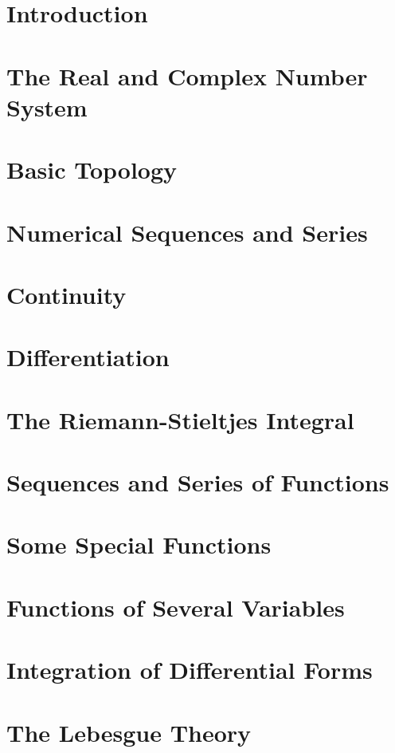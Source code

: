 
\chapter{Introduction}\label{chap:intro}


\chapter{The Real and Complex Number System}\label{chap:number-systems}


\chapter{Basic Topology}\label{chap:topology}
% 

\chapter{Numerical Sequences and Series}\label{chap:seq-series}
% 

\chapter{Continuity}\label{chap:continuity}
% 

\chapter{Differentiation}\label{chap:differentiation}
% 

\chapter{The Riemann-Stieltjes Integral}\label{chap:integration}
% 

\chapter{Sequences and Series of Functions}\label{chap:seq-series-functions}
% 

\chapter{Some Special Functions}
% 

\chapter{Functions of Several Variables}\label{chap:multivariable}
% 

\chapter{Integration of Differential Forms}\label{chap:forms}
% 

\chapter{The Lebesgue Theory}\label{chap:lebesgue}
% 


